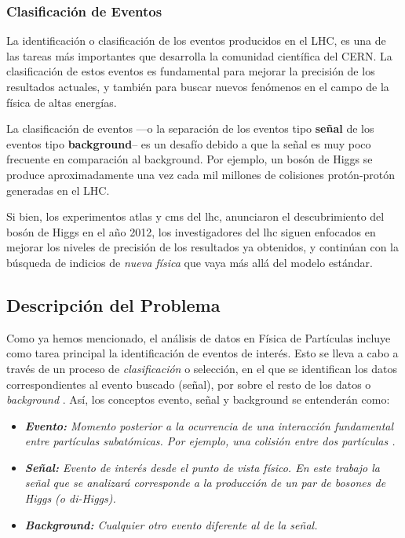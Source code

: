 \subsubsection{Clasificación de Eventos}
La  identificación o clasificación de los eventos producidos en el LHC, es una de las tareas más importantes que desarrolla la comunidad científica del CERN.
%
La clasificación de estos eventos es fundamental para mejorar la precisión de los resultados actuales, y también para buscar nuevos fenómenos en el campo de la física de altas energías.
%

La clasificación de eventos ---o la separación de los eventos tipo {\bf señal} de los eventos tipo {\bf background}--  
es un desafío debido a que la señal es muy poco frecuente en comparación al background.
%
Por ejemplo, un bosón de Higgs se produce  aproximadamente una vez cada mil millones de colisiones protón-protón generadas en el LHC.


Si bien, los experimentos \acrshort{atlas} \cite{Aad2012,ATLASweb} y \acrshort{cms} \cite{Chatrchyan2012} del \acrshort{lhc}, anunciaron el descubrimiento del bosón de Higgs en el año 2012, los investigadores del \acrshort{lhc} siguen enfocados en mejorar los niveles de precisión de los resultados ya obtenidos, y continúan con la búsqueda de indicios de \textit{nueva física} que vaya más allá del modelo estándar.
%
%
%
\subsection{Descripción del Problema}
%
Como ya hemos mencionado, el análisis de datos en Física de Partículas incluye como tarea principal la identificación de eventos de interés. 
%
Esto se lleva a cabo a través de un proceso de \textit{clasificación} o selección, en el que se identifican los datos correspondientes al evento buscado (señal), por sobre el resto de los datos o \textit{background} \cite{BiniClass}. 
%
Así, los conceptos evento, señal y background  se entenderán como:
%
\begin{itemize}
    \item \emph{{\bf Evento:} Momento posterior a la ocurrencia de una interacción fundamental entre partículas subatómicas. Por ejemplo, una colisión entre dos partículas \cite{symmWP}.}
    
    \item \emph{{\bf Señal:} Evento de interés desde el punto de vista físico. En este trabajo la señal que se analizará corresponde a la producción de un par de bosones de Higgs (o di-Higgs).} 
    
    \item \emph{{\bf Background:} Cualquier otro evento diferente al de la señal.}
    
\end{itemize}

